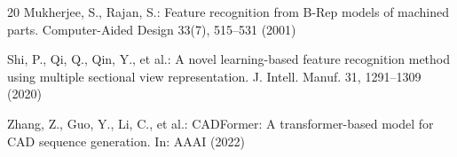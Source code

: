 \documentclass{styles/svproc}
\begin{document}
\begin{thebibliography}{20}
Mukherjee, S., Rajan, S.: Feature recognition from B-Rep models of machined parts. Computer-Aided Design 33(7), 515--531 (2001)

Shi, P., Qi, Q., Qin, Y., et al.: A novel learning-based feature recognition method using multiple sectional view representation. J. Intell. Manuf. 31, 1291--1309 (2020)

Zhang, Z., Guo, Y., Li, C., et al.: CADFormer: A transformer-based model for CAD sequence generation. In: AAAI (2022)

\end{thebibliography}
\end{document}
